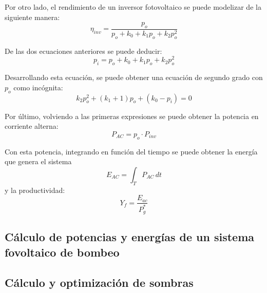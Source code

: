 Por otro lado, el rendimiento de un inversor fotovoltaico se puede modelizar de la siguiente manera:
\begin{equation}
\eta_{inv}=\frac{p_o}{p_o+k_0+k_1p_o+k_2p_o^2}
\end{equation}

De las dos ecuaciones anteriores se puede deducir:
\begin{equation}
p_i=p_o+k_0+k_1p_o+k_2p_o^2
\end{equation}

Desarrollando esta ecuación, se puede obtener una ecuación de segundo grado con \(p_o\) como incógnita:
\begin{equation}
k_2p_o^2+(k_1+1)p_o+(k_0-p_i)=0
\end{equation}

Por último, volviendo a las primeras expresiones se puede obtener la potencia en corriente alterna:
\begin{equation}
P_{AC}=p_o\cdot P_{inv}
\end{equation}

Con esta potencia, integrando en función del tiempo se puede obtener la energía que genera el sistema
\begin{equation}
E_{AC}=\int_{T} P_{AC} \,dt
\end{equation}
y la productividad:
\begin{equation}
Y_f=\frac{E_{ac}}{P_g^*}
\end{equation}

\subsection{Cálculo de potencias y energías de un sistema fovoltaico de bombeo}
\label{sec:orgc591d56}

\subsection{Cálculo y optimización de sombras}
\label{sec:org04b6fc7}
